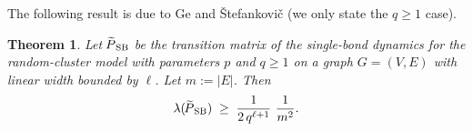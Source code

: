 \documentclass{dis}
\newtheorem{theorem}{Theorem}[chapter]
\theoremstyle{citing}
\begin{document}
The following result is due to Ge and {\v{S}}tefankovi{\v{c}} 
\cite{GeS} (we only state the $q\ge1$ case).

\begin{theorem} \label{th:SB_linear-width}
Let ${{\raisebox{2pt}{ ${\widetilde{{}}}$ }\mkern-14mu P}_{\rm SB}}$ be the transition matrix
of the single-bond dynamics for the random-cluster model 
with parameters $p$ and $q\ge1$ 
on a graph $G=(V,E)$ with linear width bounded by $\ell$. 
Let $m:={\left\vert {E} \right\vert}$. Then
\begin{equation} \label{eq:th-width}
\lambda({{\raisebox{2pt}{ ${\widetilde{{}}}$ }\mkern-14mu P}_{\rm SB}})
\;\ge\; \frac{1}{2\, q^{\ell+1}}\ \frac{1}{m^2}.
\vspace{2mm}
\end{equation}
\end{theorem}
\end{document}
